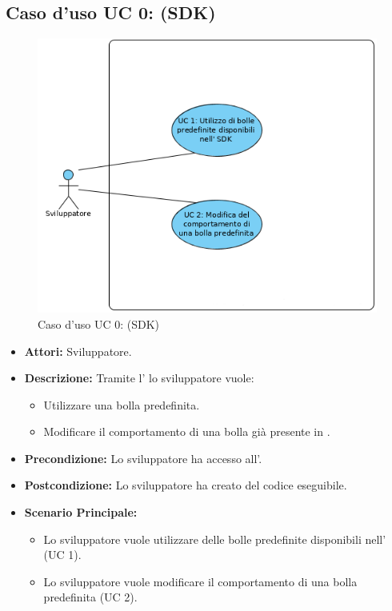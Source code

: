\FloatBarrier
\subsection{Caso d'uso UC 0: \progetto (SDK)}
\label{Caso d'uso UC 0: \progetto (SDK)}
\begin{figure}[ht]
	\centering
	\includegraphics[scale=0.80]{Usecases/img/Monolith.png}
	\caption{Caso d'uso UC 0: \progetto(SDK)}
\end{figure}

\FloatBarrier
\begin{itemize}
\item \textbf{Attori:} Sviluppatore.
\item \textbf{Descrizione:} Tramite l' lo sviluppatore vuole:
	\begin{itemize}
	\item{Utilizzare una bolla predefinita.}
	\item{Modificare il comportamento di una bolla già presente in \progetto.}
	\end{itemize}
\item \textbf{Precondizione:} Lo sviluppatore ha accesso all'.
\item \textbf{Postcondizione:} Lo sviluppatore ha creato del codice eseguibile.
\item \textbf{Scenario Principale:}
	\begin{itemize}
	\item{Lo sviluppatore vuole utilizzare delle bolle predefinite disponibili nell' (UC 1).}
	\item{Lo sviluppatore vuole modificare il comportamento di una bolla predefinita (UC 2).}
	\end{itemize}
\end{itemize}